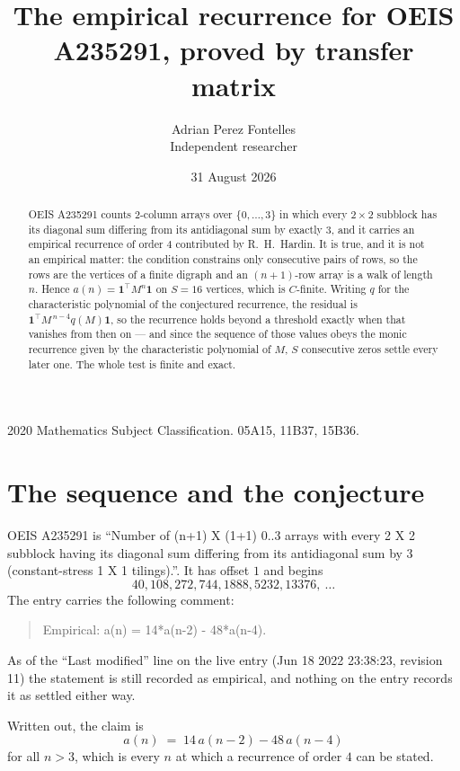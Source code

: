 \documentclass[11pt,a4paper]{article}
\title{The empirical recurrence for OEIS A235291, proved by transfer matrix}
\author{Adrian Perez Fontelles\\ \small Independent researcher}
\date{31 August 2026}
\theoremstyle{plain}
\theoremstyle{definition}
\begin{document}
\maketitle

\begin{abstract}
OEIS A235291 counts $2$-column arrays over $\{0,\dots,3\}$ in which every
$2\times2$ subblock has its diagonal sum differing from its antidiagonal sum by
exactly $3$, and it
carries an empirical recurrence of order $4$ contributed by R.~H.~Hardin. It is true,
and it is not an empirical matter: the condition constrains only consecutive pairs of rows,
so the rows are the vertices of a finite digraph and an $(n+1)$-row array is a walk of
length $n$. Hence $a(n)=\mathbf{1}^{\!\top}M^{n}\mathbf{1}$ on $S=16$ vertices, which
is $C$-finite. Writing $q$ for the characteristic polynomial of the conjectured recurrence,
the residual is $\mathbf{1}^{\!\top}M^{\,n-4}q(M)\mathbf{1}$, so the recurrence
holds beyond a threshold exactly when that vanishes from then on --- and since the sequence
of those values obeys the monic recurrence given by the characteristic polynomial of $M$,
$S$ consecutive zeros settle every later one. The whole test is finite and exact.
\end{abstract}

\noindent\small 2020 Mathematics Subject Classification. 05A15, 11B37, 15B36.\normalsize

\section{The sequence and the conjecture}

OEIS A235291 is ``Number of (n+1) X (1+1) 0..3 arrays with every 2 X 2 subblock having its diagonal sum differing from its antidiagonal sum by 3 (constant-stress 1 X 1 tilings).''. It has offset
$1$ and begins
\[
40, 108, 272, 744, 1888, 5232, 13376,\ \dots
\]
The entry carries the following comment:
\begin{quote}\small
Empirical: a(n) = 14*a(n-2) - 48*a(n-4).
\end{quote}
As of the ``Last modified'' line on the live entry (Jun 18 2022 23:38:23, revision 11) the statement is
still recorded as empirical, and nothing on the entry records it as settled either way.

Written out, the claim is
\begin{equation}\label{eq:conj}
a(n)\;=\;14\,a(n-2) - 48\,a(n-4)
\end{equation}
for all $n>3$, which is every $n$ at which a recurrence of order $4$ can be
stated.
\end{document}
